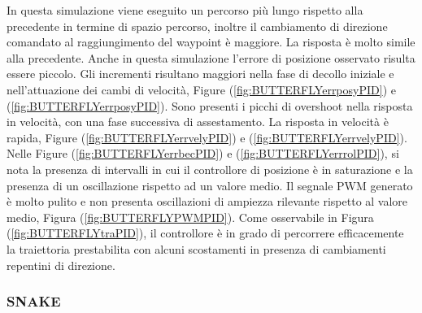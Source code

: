 In questa simulazione viene eseguito un percorso più lungo rispetto alla precedente in termine di spazio percorso, inoltre il cambiamento di direzione comandato al raggiungimento del waypoint è maggiore. La risposta è molto simile alla precedente. Anche in questa simulazione l'errore di posizione osservato risulta essere piccolo. Gli incrementi risultano maggiori nella fase di decollo iniziale e nell'attuazione dei cambi di velocità, Figure (\ref{fig:BUTTERFLYerrposyPID}) e (\ref{fig:BUTTERFLYerrposyPID}). Sono presenti i picchi di overshoot nella risposta in velocità, con una fase successiva di assestamento. La risposta in velocità è rapida, Figure (\ref{fig:BUTTERFLYerrvelyPID}) e (\ref{fig:BUTTERFLYerrvelyPID}). Nelle Figure (\ref{fig:BUTTERFLYerrbecPID}) e (\ref{fig:BUTTERFLYerrrolPID}), si nota la presenza di intervalli in cui il controllore di posizione è in saturazione e la presenza di un oscillazione rispetto ad un valore medio. Il segnale PWM generato è molto pulito e non presenta oscillazioni di ampiezza rilevante rispetto al valore medio, Figura (\ref{fig:BUTTERFLYPWMPID}). Come osservabile in Figura (\ref{fig:BUTTERFLYtraPID}), il controllore è in grado di percorrere efficacemente la traiettoria prestabilita con alcuni scostamenti in presenza di cambiamenti repentini di direzione.

\subsubsection{SNAKE}

